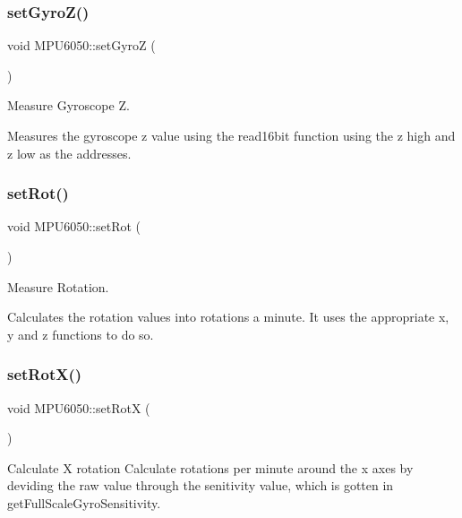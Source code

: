 \subsubsection{\texorpdfstring{set\+Gyro\+Z()}{setGyroZ()}}
{\footnotesize\ttfamily void M\+P\+U6050\+::set\+GyroZ (\begin{DoxyParamCaption}{ }\end{DoxyParamCaption})}



Measure Gyroscope Z. 

Measures the gyroscope z value using the read16bit function using the z high and z low as the addresses. \mbox{\label{class_m_p_u6050_a83e29b3477e8953b16111d5d504a5795}} 
\subsubsection{\texorpdfstring{set\+Rot()}{setRot()}}
{\footnotesize\ttfamily void M\+P\+U6050\+::set\+Rot (\begin{DoxyParamCaption}{ }\end{DoxyParamCaption})}



Measure Rotation. 

Calculates the rotation values into rotations a minute. It uses the appropriate x, y and z functions to do so. \mbox{\label{class_m_p_u6050_ad1cfcae9653af68ac64361fcb66b7824}} 
\subsubsection{\texorpdfstring{set\+Rot\+X()}{setRotX()}}
{\footnotesize\ttfamily void M\+P\+U6050\+::set\+RotX (\begin{DoxyParamCaption}{ }\end{DoxyParamCaption})}



Calculate X rotation  Calculate rotations per minute around the x axes by deviding the raw value through the senitivity value, which is gotten in get\+Full\+Scale\+Gyro\+Sensitivity. 

\mbox{\label{class_m_p_u6050_ad8d0842faf2f95f4609111d14d432e5e}} 
